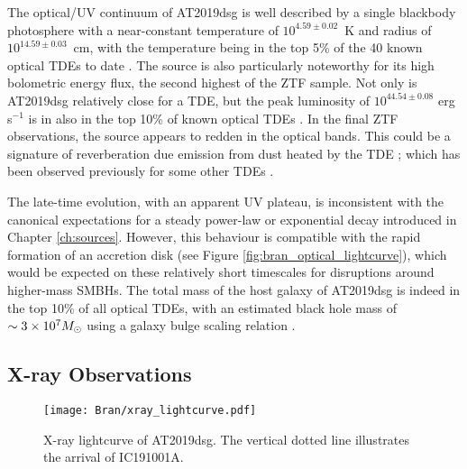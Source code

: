 The optical/UV continuum of AT2019dsg is well described by a single blackbody photosphere with a near-constant temperature of $10^{4.59 \pm 0.02}$~K and radius of $10^{14.59 \pm 0.03}$~cm, with the temperature being in the top 5\% of the 40 known optical TDEs to date . The source is also particularly noteworthy for its high bolometric energy flux, the second highest of the ZTF sample. Not only is AT2019dsg relatively close for a TDE, but the peak luminosity of $10^{44.54 \pm 0.08}$ erg\,s$^{-1}$ is in also in the top 10\% of known optical TDEs \cite{van_velzen_20}. In the final ZTF observations, the source appears to redden in the optical bands. This could be a signature of reverberation due emission from dust heated by the TDE ; which has been observed previously for some other TDEs . 

The late-time evolution, with an apparent UV plateau, is inconsistent with the canonical expectations for a steady power-law or exponential decay introduced in Chapter \ref{ch:sources}. However, this behaviour is compatible with the rapid formation of an accretion disk  (see Figure \ref{fig:bran_optical_lightcurve}), which would be expected on these relatively short timescales for disruptions around higher-mass SMBHs. The total mass of the host galaxy of AT2019dsg is indeed in the top 10$\%$ of all optical TDEs, with an estimated black hole mass of $\sim 3 \times 10^{7} \mbox{$M_{\odot}$}$ using a galaxy bulge scaling relation \cite{van_velzen_20} .


\subsection*{X-ray Observations}

\begin{figure}[!ht]
	\texttt{[image: Bran/xray\_lightcurve.pdf]}
	\caption{X-ray lightcurve of AT2019dsg. The vertical dotted line illustrates the arrival of IC191001A.}
	\label{fig:bran_xray_lightcurve}
\end{figure}

